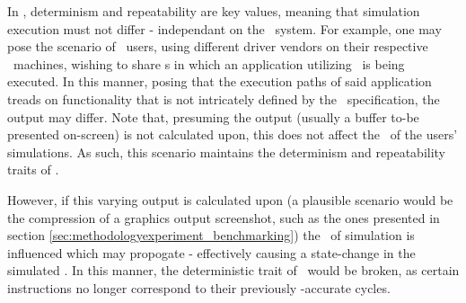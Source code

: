 In \dvttermsimics , determinism and repeatability are key values, meaning that simulation execution must not differ - independant on the \dvttermhost\ system.
For example, one may pose the scenario of \dvttermsimics\ users, using different driver vendors on their respective \dvttermhost\ machines, wishing to share \dvttermcheckpoint s in which an application utilizing \dvttermopengles\ is being executed.
In this manner, posing that the execution paths of said application treads on functionality that is not intricately defined by the \dvttermopengles\ specification, the output may differ.
Note that, presuming the output (usually a buffer to-be presented on-screen) is not calculated upon, this does not affect the \dvttermtiming\ of the users' simulations.
As such, this scenario maintains the determinism and repeatability traits of \dvttermsimics .

However, if this varying output is calculated upon (a plausible scenario would be the compression of a graphics output screenshot, such as the ones presented in section \ref{sec:methodologyexperiment_benchmarking}) the \dvttermtiming\ of simulation is influenced which may propogate - effectively causing a state-change in the simulated \dvttermcpu .
In this manner, the deterministic trait of \dvttermsimics\ would be broken, as certain instructions no longer correspond to their previously \dvttermtiming -accurate cycles.

